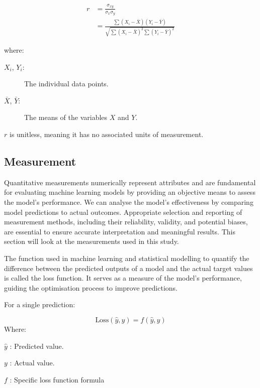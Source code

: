\begin{itemize}
\begin{itemize}
			
			\begin{align*}
				r &= \frac{\sigma_{xy}}{\sigma_x\sigma_y}\\
				  &= \frac{\sum (X_i - \bar{X})(Y_i - \bar{Y}) }{\sqrt{\sum (X_i - \bar{X})^2 \sum (Y_i - \bar{Y})^2}}
			\end{align*}
			
			
			
			where:
			\begin{description}
				\item[$X_i$, $Y_i$:] The individual data points.
				\item[$\bar{X}$, $\bar{Y}$:] The means of the variables $X$ and $Y$.
			\end{description}
			
			$r$ is unitless, meaning it has no associated units of measurement.
			
			
		\end{itemize}
	\end{itemize}
	
	
	
	
	
	\subsection{Measurement}
	
		Quantitative measurements numerically represent attributes and are fundamental for evaluating machine learning models by providing an objective means to assess the model's performance. We can analyse the model's effectiveness by comparing model predictions to actual outcomes. Appropriate selection and reporting of measurement methods, including their reliability, validity, and potential biases, are essential to ensure accurate interpretation and meaningful results. This section will look at the measurements used in this study.
		
		The function used in machine learning and statistical modelling to quantify the difference between the predicted outputs of a model and the actual target values is called the loss function. It serves as a measure of the model's performance, guiding the optimisation process to improve predictions.
		
		For a single prediction:
		
		$$\text{Loss}(\hat{y}, y) = f(\hat{y}, y)$$
		Where:
		
		
		\begin{compactitem}
			\item [$\hat{y}$]: Predicted value.
			\item [$y$]: Actual value.
			\item [$f$]: Specific loss function formula
		\end{compactitem}
		
